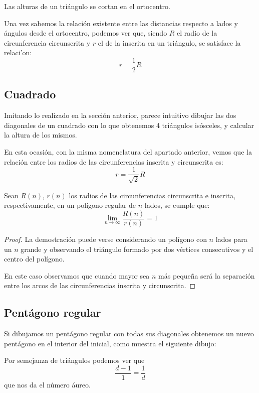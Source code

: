 \documentclass{apuntes}
\begin{document}
\begin{theorem}
Las alturas de un triángulo se cortan en el ortocentro.
\end{theorem}

Una vez sabemos la relación existente entre las distancias respecto a lados y ángulos desde el ortocentro, podemos ver que, siendo $R$ el radio de la circunferencia circunscrita y $r$ el de la inscrita en un triángulo, se satisface la relaci'on:
\[r = \frac{1}{2} R\]

\subsection{Cuadrado}
Imitando lo realizado en la sección anterior, parece intuitivo dibujar las dos diagonales de un cuadrado con lo que obtenemos 4 triángulos isósceles, y calcular la altura de los mismos.

\begin{center}
\end{center}

En esta ocasión, con la misma nomenclatura del apartado anterior, vemos que la relación entre los radios de las circunferencias inscrita y circunscrita es:
\[r = \frac{1}{\sqrt{2}}R\]

\begin{theorem}
Sean $R(n)$, $r(n)$ los radios de las circunferencias circunscrita e inscrita, respectivamente, en un polígono regular de $n$ lados, se cumple que:
\[\lim_{n\to \infty} \frac{R(n)}{r(n)}=1\]
\end{theorem}
\begin{proof}
La demostración puede verse considerando un polígono con $n$ lados para un $n$ grande y observando el triángulo formado por dos vértices consecutivos y el centro del polígono.

En este caso observamos que cuando mayor sea $n$ más pequeña será la separación entre los arcos de las circunferencias inscrita y circunscrita.
\end{proof}

\subsection{Pentágono regular}

Si dibujamos un pentágono regular con todas sus diagonales obtenemos un nuevo pentágono en el interior del inicial, como muestra el siguiente dibujo:


\begin{minipage}{0.56\textwidth}
\begin{center}
\end{center}
\end{minipage}
\begin{minipage}{0.43\textwidth}
Por semejanza de triángulos podemos ver que
\[\frac{d-1}{1} = \frac{1}{d}\]
que nos da el número áureo.
\end{minipage}
\end{document}
